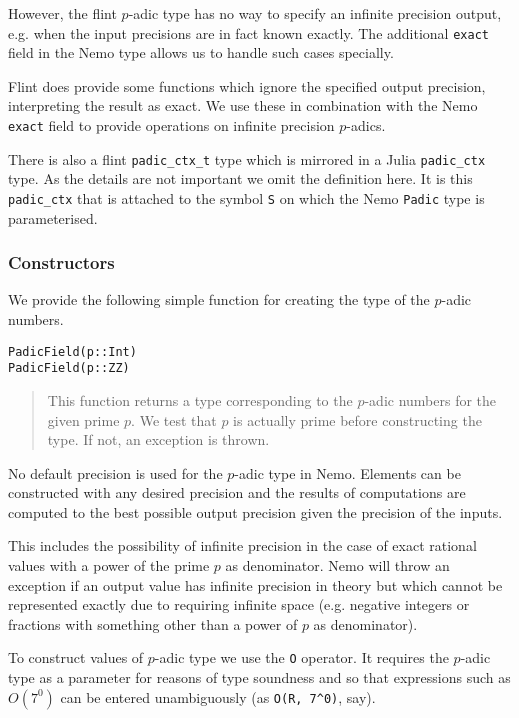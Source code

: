 \documentclass[a4paper,10pt]{article}
\newcommand{\code}{\lstinline}
\newcommand{\desc}[1]{\vspace{-3mm}\begin{quote}#1\end{quote}}
\begin{document}
{{However, the flint $p$-adic type has no way to specify an infinite precision
output, e.g. when the input precisions are in fact known exactly. The
additional \code{exact} field in the Nemo type allows us to handle such cases
specially.

Flint does provide some functions which ignore the specified output precision,
interpreting the result as exact. We use these in combination with the Nemo
\code{exact} field to provide operations on infinite precision $p$-adics.

There is also a flint \code{padic_ctx_t} type which is mirrored in a Julia
\code{padic_ctx} type. As the details are not important we omit the definition
here. It is this \code{padic_ctx} that is attached to the symbol \code{S} on
which the Nemo \code{Padic} type is parameterised.

\subsubsection{Constructors}

We provide the following simple function for creating the type of the $p$-adic
numbers.

\begin{lstlisting}
PadicField(p::Int)
PadicField(p::ZZ)
\end{lstlisting}

\desc{This function returns a type corresponding to the $p$-adic numbers for
the given prime $p$. We test that $p$ is actually prime before constructing
the type. If not, an exception is thrown.}

No default precision is used for the $p$-adic type in Nemo. Elements can be
constructed with any desired precision and the results of computations are
computed to the best possible output precision given the precision of the
inputs. 

This includes the possibility of infinite precision in the case of exact
rational values with a power of the prime $p$ as denominator. Nemo will throw
an exception if an output value has infinite precision in theory but which
cannot be represented exactly due to requiring infinite space (e.g. negative
integers or fractions with something other than a power of $p$ as denominator).

To construct values of $p$-adic type we use the \code{O} operator. It requires
the $p$-adic type as a parameter for reasons of type soundness and so that
expressions such as $O(7^0)$ can be entered unambiguously (as \code{O(R, 7^0)},
say).

}}
\end{document}
